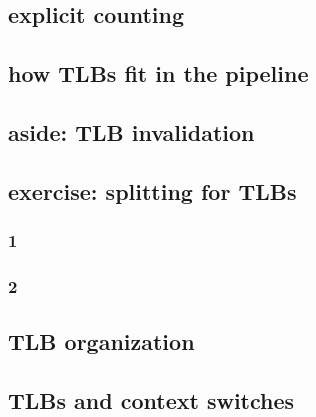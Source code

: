 \subsection{explicit counting}


\subsection{how TLBs fit in the pipeline}


\subsection{aside: TLB invalidation}


\subsection{exercise: splitting for TLBs}
\subsubsection{1}

\subsubsection{2}



\subsection{TLB organization}



\subsection{TLBs and context switches}


